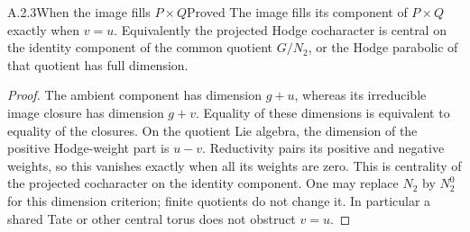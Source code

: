 \begin{result}{A.2.3}{When the image fills $P\times Q$}{Proved}
The image fills its component of $P\times Q$ exactly when $v=u$.
Equivalently the projected Hodge cocharacter is central on the
identity component of the common quotient $G/N_2$, or the Hodge
parabolic of that quotient has full dimension.
\end{result}
\begin{proof}
The ambient component has dimension $g+u$, whereas its irreducible
image closure has dimension $g+v$. Equality of these dimensions is
equivalent to equality of the closures. On the quotient Lie algebra,
the dimension of the positive Hodge-weight part is $u-v$.
Reductivity pairs its positive and negative weights, so this
vanishes exactly when all its weights are zero. This is centrality
of the projected cocharacter on the identity component. One may
replace $N_2$ by $N_2^0$ for this dimension criterion; finite quotients
do not change it. In particular a shared Tate or other central torus
does not obstruct $v=u$.
\end{proof}

